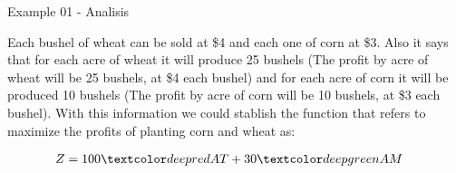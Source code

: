 \begin{frame}{Example 01 - Analisis}

Each bushel of wheat can be sold at \$4 and each one of corn at \$3. Also it
says that for each acre of wheat  it will produce 25 bushels (The profit by acre
of wheat will be 25 bushels, at \$4 each bushel) and for each acre of corn it
will be produced 10 bushels (The profit by acre of corn will be 10  bushels, at
\$3 each bushel). With this information we could stablish the function that
refers to maximize the profits of planting corn and wheat as:

\begin{align*}
    Z &= 100\colora{AT} + 30\colorb{AM}
\end{align*}


\end{frame}
